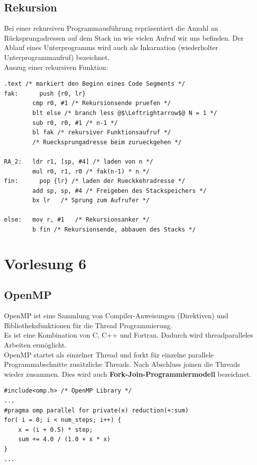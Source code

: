 \documentclass[a4paper,12pt,leqno]{article}
\begin{document}
\subsection{Rekursion}
Bei einer rekursiven Programmausführung repräsentiert die Anzahl an Rücksprungadressen auf dem Stack im wie vielen Aufruf wir uns befinden. Der Ablauf eines Unterprogramms wird auch als Inkarnation (wiederholter Unterprogrammaufruf) bezeichnet.\\
Auszug einer rekursiven Funktion:
\begin{lstlisting}
.text /* markiert den Beginn eines Code Segments */
fak:      push {r0, lr}
		cmp r0, #1 /* Rekursionsende pruefen */
		blt else /* branch less @$\Leftrightarrow$@ N = 1 */
		sub r0, r0, #1 /* n-1 */
		bl fak /* rekursiver Funktionsaufruf */
		/* Ruecksprungadresse beim zurueckgehen */

RA_2:	ldr r1, [sp, #4] /* laden von n */
		mul r0, r1, r0 /* fak(n-1) * n */
fin:      pop {lr} /* laden der Rueckkehradresse */
		add sp, sp, #4 /* Freigeben des Stackspeichers */
		bx lr	/* Sprung zum Aufrufer */
		
else:	mov r, #1	/* Rekursionsanker */
		b fin /* Rekursionsende, abbauen des Stacks */
\end{lstlisting}

\section{Vorlesung 6}
\subsection{OpenMP}
OpenMP ist eine Sammlung von Compiler-Anweisungen (Direktiven) und Bibliotheksfunktionen für die Thread Programmierung.\\
Es ist eine Kombination von C, C++ und Fortran. Dadurch wird threadparalleles Arbeiten ermöglicht.\\
OpenMP startet als einzelner Thread und forkt für einzelne parallele Programmabschnitte zusätzliche Threads. Nach Abschluss joinen die Threads wieder zusammen. Dies wird auch \textbf{Fork-Join-Programmiermodell} bezeichnet.\\

\begin{lstlisting}
#include<omp.h> /* OpenMP Library */
...
#pragma omp parallel for private(x) reduction(+:sum)
for( i = 0; i < num_steps; i++) {
	x = (i + 0.5) * step;
	sum += 4.0 / (1.0 + x * x)
}
...
\end{lstlisting}
\end{document}
